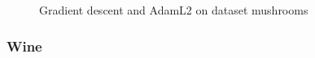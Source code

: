 \documentclass{article}
\begin{document}
\begin{figure}[H]
\begin{minipage}[h]{0.5\linewidth}
\end{minipage}
\hfill
\begin{minipage}[h]{0.5\linewidth}
\end{minipage}
\caption{Gradient descent and AdamL2 on dataset mushrooms}
\label{fig:m_gd_adaml2}
\end{figure}

\subsubsection{Wine}
\end{document}
